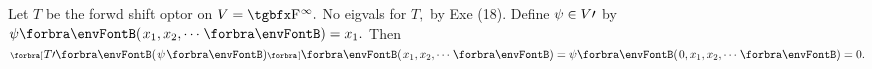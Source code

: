 Let $T$ be the forwd shift optor on $V=\FbbP{\infty}.$ No eigvals for $T,$ by Exe (18).\parSol{}
Define $\psi\in V\prime$ by $\psi\Par{x_1,x_2,\cdots}=x_1.$ Then $\Sbra{T\apostrophe\Par{\psi}}\Par{x_1,x_2,\cdots}=\psi\Par{0,x_1,x_2,\cdots}=0.$\PfEnd
\SepLine


